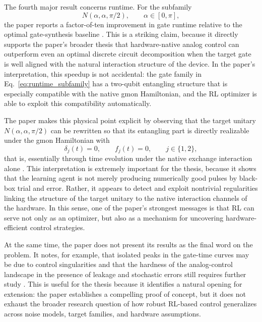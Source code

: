 The fourth major result concerns runtime. For the subfamily
\begin{equation}
N(\alpha,\alpha,\pi/2),
\qquad
\alpha\in[0,\pi],
\label{eq:runtime_subfamily}
\end{equation}
the paper reports a factor-of-ten improvement in gate runtime relative to the optimal gate-synthesis baseline \cite{Niu2019}. This is a striking claim, because it directly supports the paper's broader thesis that hardware-native analog control can outperform even an optimal discrete circuit decomposition when the target gate is well aligned with the natural interaction structure of the device. In the paper's interpretation, this speedup is not accidental: the gate family in Eq.~\eqref{eq:runtime_subfamily} has a two-qubit entangling structure that is especially compatible with the native gmon Hamiltonian, and the RL optimizer is able to exploit this compatibility automatically.

The paper makes this physical point explicit by observing that the target unitary \(N(\alpha,\alpha,\pi/2)\) can be rewritten so that its entangling part is directly realizable under the gmon Hamiltonian with
\begin{equation}
\delta_j(t)=0,
\qquad
f_j(t)=0,
\qquad
j\in\{1,2\},
\label{eq:hardware_aligned_subfamily}
\end{equation}
that is, essentially through time evolution under the native exchange interaction alone \cite{Niu2019}. This interpretation is extremely important for the thesis, because it shows that the learning agent is not merely producing numerically good pulses by black-box trial and error. Rather, it appears to detect and exploit nontrivial regularities linking the structure of the target unitary to the native interaction channels of the hardware. In this sense, one of the paper's strongest messages is that RL can serve not only as an optimizer, but also as a mechanism for uncovering hardware-efficient control strategies.

At the same time, the paper does not present its results as the final word on the problem. It notes, for example, that isolated peaks in the gate-time curves may be due to control singularities and that the hardness of the analog-control landscape in the presence of leakage and stochastic errors still requires further study \cite{Niu2019}. This is useful for the thesis because it identifies a natural opening for extension: the paper establishes a compelling proof of concept, but it does not exhaust the broader research question of how robust RL-based control generalizes across noise models, target families, and hardware assumptions.

